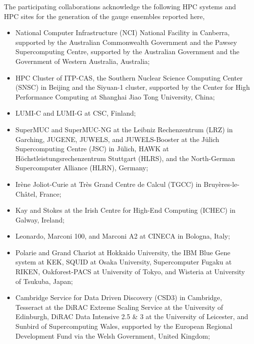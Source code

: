 \documentclass[a4paper,11pt]{article}
\begin{document}
The participating collaborations acknowledge the following HPC systems
and HPC sites for the generation of the gauge ensembles reported here,

\begin{itemize}[leftmargin=*, align=left, itemsep=1pt, topsep=0pt, parsep=0pt]
\item National Computer Infrastructure (NCI) National Facility in
  Canberra, supported by the Australian Commonwealth Government and
  the Pawsey Supercomputing Centre, supported by the Australian
  Government and the Government of Western Australia, Australia;
  
\item HPC Cluster of ITP-CAS, the Southern Nuclear Science
  Computing Center (SNSC) in Beijing and the Siyuan-1 cluster,
  supported by the Center for High Performance Computing at Shanghai
  Jiao Tong University, China;
  
\item LUMI-C and LUMI-G at CSC, Finland;
  
\item SuperMUC and SuperMUC-NG at the Leibniz Rechenzentrum (LRZ) in
  Garching, JUGENE, JUWELS, and JUWELS-Booster at the Jülich
  Supercomputing Centre (JSC) in J\"ulich, HAWK at
  Höchstleistungsrechenzentrum Stuttgart (HLRS), and the
  North-German Supercomputer Alliance (HLRN), Germany;

\item  Irène Joliot-Curie at Très Grand Centre de Calcul (TGCC) in
  Bruyères-le-Châtel, France;

\item Kay and Stokes at the Irish Centre for High-End Computing
  (ICHEC) in Galway, Ireland;

\item Leonardo, Marconi 100, and Marconi A2 at CINECA in Bologna,
  Italy;
  
\item Polarie and Grand Chariot at Hokkaido University, the IBM Blue
  Gene system at KEK, SQUID at Osaka University, Supercomputer
  Fugaku at RIKEN, Oakforest-PACS at University of Tokyo, and
  Wisteria at University of Tsukuba, Japan;
  

\item Cambridge Service for Data Driven Discovery (CSD3) in Cambridge,
  Tesseract at the DiRAC Extreme Scaling Service at the University of
  Edinburgh, DiRAC Data Intensive 2.5 \& 3 at the University of
  Leicester, and Sunbird of Supercomputing Wales, supported by the
  European Regional Development Fund via the Welsh Government, United
  Kingdom;
    

\end{itemize}
\end{document}
